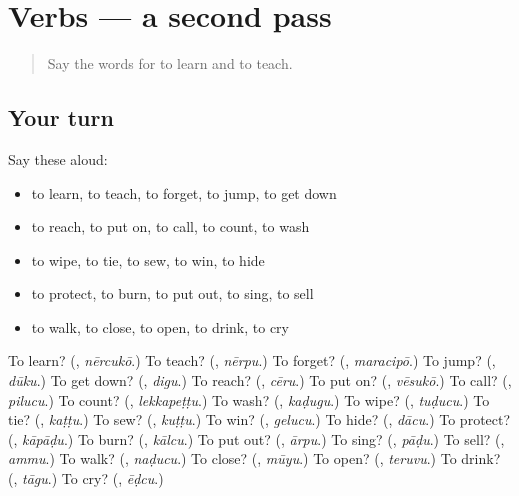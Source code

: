 \section[(dialogue)]{Verbs — a second pass}

\label{lesson:TE-R149-second-pass-verbs}



\begin{quote}
Say the words for to learn and to teach.
\end{quote}

\subsection*{Your turn}
Say these aloud:

\begin{itemize}
\raggedright
  \item to learn, to teach, to forget, to jump, to get down
  \item to reach, to put on, to call, to count, to wash
  \item to wipe, to tie, to sew, to win, to hide
  \item to protect, to burn, to put out, to sing, to sell
  \item to walk, to close, to open, to drink, to cry
\end{itemize}

\begin{tcolorbox}[breakable,colback=teal!4,colframe=teal!35!black,title={Before you move on}]
To learn? (\textbf{}, \emph{nērcukō}.) To teach? (\textbf{}, \emph{nērpu}.) To forget? (\textbf{}, \emph{maracipō}.) To jump? (\textbf{}, \emph{dūku}.) To get down? (\textbf{}, \emph{digu}.) To reach? (\textbf{}, \emph{cēru}.) To put on? (\textbf{}, \emph{vēsukō}.) To call? (\textbf{}, \emph{pilucu}.) To count? (\textbf{}, \emph{lekkapeṭṭu}.) To wash? (\textbf{}, \emph{kaḍugu}.) To wipe? (\textbf{}, \emph{tuḍucu}.) To tie? (\textbf{}, \emph{kaṭṭu}.) To sew? (\textbf{}, \emph{kuṭṭu}.) To win? (\textbf{}, \emph{gelucu}.) To hide? (\textbf{}, \emph{dācu}.) To protect? (\textbf{}, \emph{kāpāḍu}.) To burn? (\textbf{}, \emph{kālcu}.) To put out? (\textbf{}, \emph{ārpu}.) To sing? (\textbf{}, \emph{pāḍu}.) To sell? (\textbf{}, \emph{ammu}.) To walk? (\textbf{}, \emph{naḍucu}.) To close? (\textbf{}, \emph{mūyu}.) To open? (\textbf{}, \emph{teruvu}.) To drink? (\textbf{}, \emph{tāgu}.) To cry? (\textbf{}, \emph{ēḍcu}.)
\end{tcolorbox}

